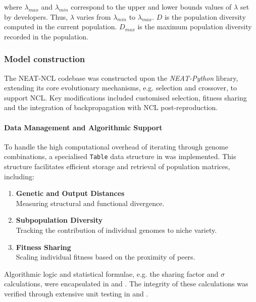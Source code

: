 \documentclass{article}
\begin{document}
where $\lambda_{max}$ and $\lambda_{min}$ correspond to the upper and lower bounds values of $\lambda$ set by developers. Thus, $\lambda$ varies from $\lambda_{min}$ to $\lambda_{max}$. $D$ is the population diversity computed in the current population. $D_{max}$ is the maximum population diversity recorded in the population. 


\subsubsection{Model construction}
\label{subsubsec:stage_3_model_construction}
The NEAT-NCL codebase was constructed upon the \textit{NEAT-Python} library, extending its core evolutionary mechanisms, e.g. selection and crossover, to support NCL. Key modifications included customised selection, fitness sharing and the integration of backpropagation with NCL post-reproduction. 

\paragraph{Data Management and Algorithmic Support}
To handle the high computational overhead of iterating through genome combinations, a specialised \texttt{Table} data structure in  was implemented. This structure facilitates efficient storage and retrieval of population matrices, including: 

\begin{enumerate}
    \item \textbf{Genetic and Output Distances} \\
    Measuring structural and functional divergence. 

    \item \textbf{Subpopulation Diversity} \\
    Tracking the contribution of individual genomes to niche variety. 

    \item \textbf{Fitness Sharing} \\
    Scaling individual fitness based on the proximity of peers. 
\end{enumerate}

Algorithmic logic and statistical formulae, e.g. the sharing factor and $\sigma$ calculations, were encapsulated in  and . The integrity of these calculations was verified through extensive unit testing in  and . 
\end{document}
